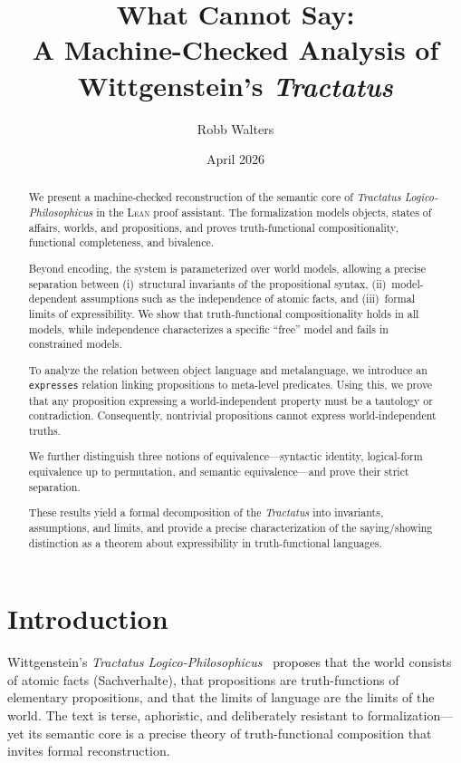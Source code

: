 \documentclass[10pt, letterpaper]{article}
\title{What \Lean{} Cannot Say:\\
A Machine-Checked Analysis of Wittgenstein's \emph{Tractatus}}
\author{Robb Walters}
\date{April 2026}
\theoremstyle{definition}
\theoremstyle{remark}
\newcommand{\Lean}{\textsc{Lean}}
\begin{document}
\maketitle

\begin{abstract}
We present a machine-checked reconstruction of the semantic core
of \emph{Tractatus Logico-Philosophicus} in the \Lean{} proof
assistant.  The formalization models objects, states of affairs,
worlds, and propositions, and proves truth-functional
compositionality, functional completeness, and bivalence.

Beyond encoding, the system is parameterized over world models,
allowing a precise separation between (i)~structural invariants
of the propositional syntax, (ii)~model-dependent assumptions
such as the independence of atomic facts, and (iii)~formal limits
of expressibility.  We show that truth-functional compositionality
holds in all models, while independence characterizes a specific
``free'' model and fails in constrained models.

To analyze the relation between object language and metalanguage,
we introduce an \texttt{expresses} relation linking propositions
to meta-level predicates.  Using this, we prove that any
proposition expressing a world-independent property must be a
tautology or contradiction.  Consequently, nontrivial propositions
cannot express world-independent truths.

We further distinguish three notions of
equivalence---syntactic identity, logical-form equivalence up to
permutation, and semantic equivalence---and prove their strict
separation.

These results yield a formal decomposition of the \emph{Tractatus}
into invariants, assumptions, and limits, and provide a precise
characterization of the saying/showing distinction as a theorem
about expressibility in truth-functional languages.
\end{abstract}

\section{Introduction}
\label{sec:intro}

Wittgenstein's \emph{Tractatus Logico-Philosophicus}~\cite{wittgenstein1921}
proposes that the world consists of atomic facts (Sachverhalte),
that propositions are truth-functions of elementary propositions,
and that the limits of language are the limits of the world.
The text is terse, aphoristic, and deliberately resistant to
formalization---yet its semantic core is a precise theory of
truth-functional composition that invites formal reconstruction.
\end{document}
